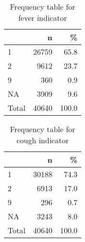 \documentclass[
]{article}
\newenvironment{Shaded}{\begin{snugshade}}{\end{snugshade}}
\newcommand{\DataTypeTok}[1]{\textcolor[rgb]{0.13,0.29,0.53}{#1}}
\newcommand{\DecValTok}[1]{\textcolor[rgb]{0.00,0.00,0.81}{#1}}
\newcommand{\KeywordTok}[1]{\textcolor[rgb]{0.13,0.29,0.53}{\textbf{#1}}}
\newcommand{\NormalTok}[1]{#1}
\newcommand{\OperatorTok}[1]{\textcolor[rgb]{0.81,0.36,0.00}{\textbf{#1}}}
\newcommand{\OtherTok}[1]{\textcolor[rgb]{0.56,0.35,0.01}{#1}}
\newcommand{\StringTok}[1]{\textcolor[rgb]{0.31,0.60,0.02}{#1}}
\begin{document}
\begin{table}[!h]

\caption{\label{tab:unnamed-chunk-55}Frequency table for fever indicator}
\centering
\begin{tabular}[t]{l|r|r}
\hline
  & n & \%\\
\hline
1 & 26759 & 65.8\\
\hline
2 & 9612 & 23.7\\
\hline
9 & 360 & 0.9\\
\hline
NA & 3909 & 9.6\\
\hline
Total & 40640 & 100.0\\
\hline
\end{tabular}
\end{table}

\begin{Shaded}
\end{Shaded}

\begin{table}[!h]

\caption{\label{tab:unnamed-chunk-56}Frequency table for cough indicator}
\centering
\begin{tabular}[t]{l|r|r}
\hline
  & n & \%\\
\hline
1 & 30188 & 74.3\\
\hline
2 & 6913 & 17.0\\
\hline
9 & 296 & 0.7\\
\hline
NA & 3243 & 8.0\\
\hline
Total & 40640 & 100.0\\
\hline
\end{tabular}
\end{table}
\end{document}
